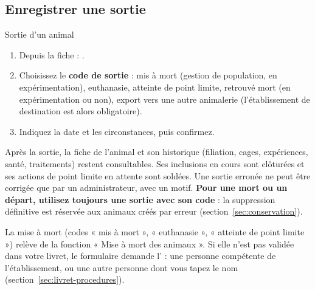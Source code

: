 \documentclass[11pt,a4paper]{article}
\begin{document}
\subsection{Enregistrer une sortie}
\begin{procedure}{Sortie d'un animal}
\begin{enumerate}
  \item Depuis la fiche : .
  \item Choisissez le \textbf{code de sortie} : mis à mort (gestion de
    population, en expérimentation), euthanasie, atteinte de point limite,
    retrouvé mort (en expérimentation ou non), export vers une autre
    animalerie (l'établissement de destination est alors obligatoire).
  \item Indiquez la date et les circonstances, puis confirmez.
\end{enumerate}
\end{procedure}
Après la sortie, la fiche de l'animal et son historique (filiation, cages,
expériences, santé, traitements) restent consultables. Ses inclusions en
cours sont clôturées et ses actions de point limite en attente sont soldées.
Une sortie erronée ne peut être corrigée que par un administrateur, avec un
motif. \textbf{Pour une mort ou un départ, utilisez toujours une sortie avec
son code} : la suppression définitive est réservée aux animaux créés par
erreur (section~\ref{sec:conservation}).
\begin{regle}
La mise à mort (codes « mis à mort », « euthanasie », « atteinte de point
limite ») relève de la fonction « Mise à mort des animaux ». Si elle n'est
pas validée dans votre livret, le formulaire demande l' : une personne compétente de l'établissement, ou une autre personne
dont vous tapez le nom (section~\ref{sec:livret-procedures}).
\end{regle}
\end{document}
